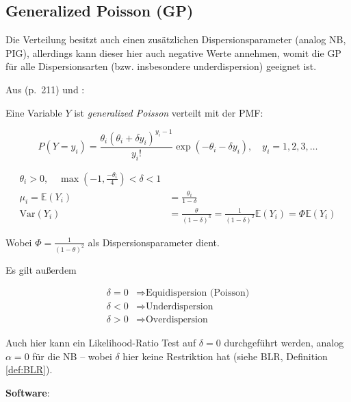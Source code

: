 \documentclass[ngerman,a4paper,]{scrartcl}
\theoremstyle{definition}
\theoremstyle{definition}
\theoremstyle{definition}
\theoremstyle{remark}
\let\BeginKnitrBlock\begin \let\EndKnitrBlock\end
\begin{document}
\hypertarget{mod-gp}{%
\subsection{Generalized Poisson (GP)}\label{mod-gp}}

Die Verteilung besitzt auch einen zusätzlichen Dispersionsparameter (analog NB, PIG), allerdings kann dieser hier auch negative Werte annehmen, womit die GP für alle Dispersionsarten (bzw. insbesondere underdispersion) geeignet ist.

\BeginKnitrBlock{definition}[Generalized Poisson]
\protect\hypertarget{def:def-genois}{}{\label{def:def-genois} \iffalse (Generalized Poisson) \fi{} }Aus \citet{hilbeModelingCountData2014} (p.~211) und \citet{harris2012ModelingUnderdispersed}:

Eine Variable \(Y\) ist \emph{generalized Poisson} verteilt mit der PMF:

\begin{equation*}
P(Y = y_i) = \frac{\theta_i \left(\theta_i + \delta y_i\right)^{y_i - 1}}{y_i !} \exp(-\theta_i - \delta y_i), \quad y_i = 1, 2, 3, \ldots
\end{equation*}

\begin{align*}
\theta_i > 0, \quad \max(-1, \frac{-\theta_i}{4}) < \delta < 1 \\[2em]
\mu_i = \mathbb{E}(Y_i) &= \frac{\theta_i}{1 - \delta} \\
\mathrm{Var}(Y_i) &= \frac{\theta}{(1 - \delta)^3} 
                   = \frac{1}{(1 - \delta)^2} \mathbb{E}(Y_i)
                   = \Phi \mathbb{E}(Y_i)
\end{align*}

Wobei \(\Phi = \frac{1}{(1 - \theta)^2}\) als Dispersionsparameter dient.

Es gilt außerdem

\begin{align*}
\delta = 0 &\Longrightarrow \text{Equidispersion (Poisson)} \\
\delta < 0 &\Longrightarrow \text{Underdispersion} \\
\delta > 0 &\Longrightarrow \text{Overdispersion}
\end{align*}

Auch hier kann ein Likelihood-Ratio Test auf \(\delta = 0\) durchgeführt werden, analog \(\alpha = 0\) für die NB -- wobei \(\delta\) hier keine Restriktion hat (siehe BLR, Definition \ref{def:BLR}).
\EndKnitrBlock{definition}

\textbf{Software}:
\end{document}
